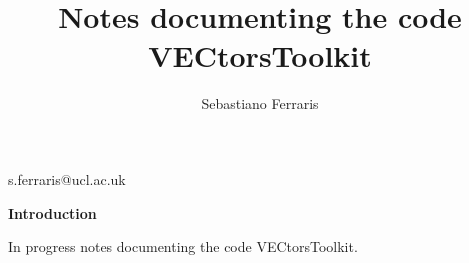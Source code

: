\documentclass{ClassNotes}
\begin{document}
\title{Notes documenting the code\\ VECtorsToolkit}

\IssueDue

\author{Sebastiano Ferraris}{s.ferraris@ucl.ac.uk}


\maketitle

\begin{center}
 {\bf Introduction}
\end{center}
In progress notes documenting the code VECtorsToolkit.


\Body %




\clearpage
\pagestyle{empty}

 \tableofcontents

\clearpage


\pagestyle{fancy} 

















\clearpage




\end{document}
